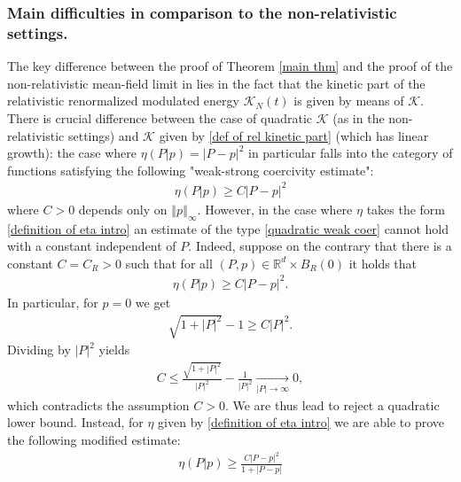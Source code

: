 \documentclass[11pt,reqno]{amsart}
\numberwithin{equation}{section}
\begin{document}
\subsubsection{Main difficulties in comparison to the non-relativistic settings.}\label{subsec novelty} The key difference  between the proof of Theorem \ref{main thm} and the proof of the non-relativistic mean-field limit in \cite{duerinckx2020mean} lies in the fact that the kinetic part of the relativistic renormalized modulated energy $\mathcal{K}_{N}(t)$ is given by means of $\mathscr{K}$. There is crucial difference between the case of quadratic $\mathscr{K}$ (as in the non-relativistic settings) and $\mathscr{K}$ given by \eqref{def of rel kinetic part} (which has linear growth):  the case where $\eta(P\vert p)=\left\vert P-p\right\vert^{2}$ in particular falls into the category of  functions satisfying the following "weak-strong coercivity estimate": 
\begin{align}
\eta(P\vert p)\geq C\left\vert P-p\right\vert^{2} \label{quadratic weak coer}     
\end{align}
where $C>0$ depends only on $\left\Vert p\right\Vert_{\infty}$. However, in the case where $\eta$ takes the form \eqref{definition of eta intro} an estimate of the type \eqref{quadratic weak coer} cannot hold with a constant independent of $P$. Indeed, suppose on the contrary that there is a constant $C=C_{R}>0$ such that for all $(P,p)\in \mathbb{R}^{d}\times B_{R}(0)$ it holds that \begin{align*}
\eta(P\vert p)\geq C\left\vert P-p\right\vert^{2}.     
\end{align*}
In particular, for $p=0$ we get 
\begin{align*}
\sqrt{1+\left\vert P\right\vert^{2} }-1 \geq C \left\vert P\right\vert^{2}.      
\end{align*}
Dividing by $\left\vert P\right\vert^{2}$ yields 
\begin{align*}
 C\leq \frac{\sqrt{1+\left\vert P\right\vert^{2}}}{\left\vert P\right\vert^{2}}-\frac{1}{\left\vert P\right\vert^{2}}\underset{\left\vert P \right\vert\rightarrow \infty }{\rightarrow}  0,     
\end{align*}
which contradicts the assumption $C>0$. 
We are thus lead to reject a quadratic lower bound. Instead, for $\eta$ given by \eqref{definition of eta intro} we are able to prove the following modified estimate:  
\begin{align}
\eta(P\vert p)\geq \frac{C\left\vert P-p\right\vert^{2}}{1+\left\vert P-p\right\vert } \label{weak strong coer bound}   
\end{align}
\end{document}
